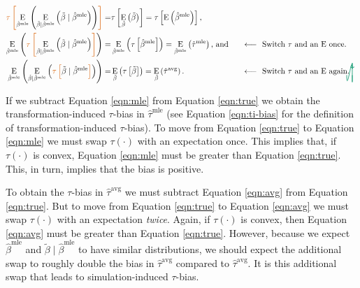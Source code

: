 \documentclass[11pt]{article}
\DeclareMathOperator*{\E}{\text{E}}
\newcommand{\tikzmark}[1]{\tikz[overlay,remember picture] \node (#1) {};}
\newcommand{\DrawBox}[2]{%
  \begin{tikzpicture}[overlay,remember picture]
    \draw[->,shorten >= 6pt, shorten <= 2pt, out=-90, in=90, distance=1.2cm, color2, thick] (MarkA.east) to (MarkB.east);
    \draw[->,shorten >= 6pt, shorten <= 2pt, out=-90, in=90, distance=1cm, color2, thick] (MarkC.west) to (MarkD.east);
  \end{tikzpicture}
}
\newcommand{\justif}[2]{&{#1}&\text{#2}}
\begin{document}
\begin{alignat}{2}
 \color{color1} \tikzmark{MarkA}\tau \left[ \normalcolor \E_{\hat{\beta}^\text{mle}}\left( \E_{\tilde{\beta} \mid \hat{\beta}^\text{mle}} \left( \tilde{\beta} \mid \hat{\beta}^\text{mle} \right) \right) \color{color1} \right] \normalcolor =&  \tau \left[ \E_{\tilde{\beta}} \left( \tilde{\beta} \right) \right] = \tau \left[\E \left( \hat{\beta}^\text{mle} \right) \right]\text{,} \label{eqn:true}\\
 \E_{\hat{\beta}^\text{mle}}\left( \color{color1} \tikzmark{MarkB}\tau\tikzmark{MarkC} \left[ \normalcolor \E_{\tilde{\beta} \mid \hat{\beta}^\text{mle}} \left( \tilde{\beta} \mid \hat{\beta}^\text{mle} \right) \color{color1} \right] \normalcolor \right)  =&  \E_{\hat{\beta}^\text{mle}} \left( \tau \left[\hat{\beta}^\text{mle} \right] \right) =  \E_{\hat{\beta}^\text{mle}} \left(\hat{\tau}^\text{mle} \right) \text{, and} \justif{\quad}{$\longleftarrow~$ Switch $\tau$ and an $\E$ once.} \label{eqn:mle}\\
\E_{\hat{\beta}^\text{mle}}\left( \E_{\tilde{\beta} \mid \hat{\beta}^\text{mle}} \left( \color{color1} \tikzmark{MarkD}\tau \left[ \normalcolor \tilde{\beta} \mid \hat{\beta}^\text{mle} \color{color1} \right] \normalcolor \right) \right)  =&
\E_{\tilde{\beta}} \left( \tau \left[\tilde{\beta} \right] \right)  =
\E_{\tilde{\beta}} \left(\hat{\tau}^\text{avg} \right) \text{.}\justif{\quad}{$\longleftarrow~$ Switch $\tau$ and an $\E$ again.}\label{eqn:avg}\DrawBox{red}{blue}
\end{alignat}

If we subtract Equation \ref{eqn:mle} from Equation \ref{eqn:true} we obtain the transformation-induced $\tau$-bias in $\hat{\tau}^\text{mle}$ (see Equation \ref{eqn:ti-bias} for the definition of transformation-induced $\tau$-bias).
To move from Equation \ref{eqn:true} to Equation \ref{eqn:mle} we must swap $\tau(\cdot)$ with an expectation once.
This implies that, if $\tau(\cdot)$ is convex, Equation \ref{eqn:mle} must be greater than Equation \ref{eqn:true}.
This, in turn, implies that the bias is positive.

To obtain the $\tau$-bias in $\hat{\tau}^\text{avg}$ we must subtract Equation \ref{eqn:avg} from Equation \ref{eqn:true}.
But to move from Equation \ref{eqn:true} to Equation \ref{eqn:avg} we must swap $\tau(\cdot)$ with an expectation \emph{twice}.
Again, if $\tau(\cdot)$ is convex, then Equation \ref{eqn:avg} must be greater than Equation \ref{eqn:true}.
However, because we expect $\hat{\beta}^\text{mle}$ and $\tilde{\beta} \mid \hat{\beta}^\text{mle}$ to have similar distributions, we should expect the additional swap to roughly double the bias in $\hat{\tau}^\text{avg}$ compared to $\hat{\tau}^\text{avg}$. It is this additional swap that leads to simulation-induced $\tau$-bias.
\end{document}

